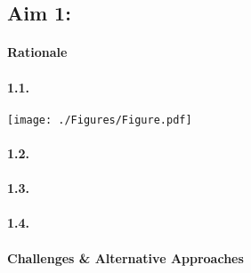 \newcommand{\FigInc}{%
\begin{wrapfigure}{R}{3.05in}
  \begin{mdframed}
  \texttt{[image: ./Figures/Figure.pdf]}
  \caption{An example figure with caption to explain.}
  \label{incFigure}
  \end{mdframed}
\end{wrapfigure}}

\subsection{Aim 1: \SpecificAimOne}

\paragraph{Rationale}

\lipsum[1-1]

\paragraph{1.1. \SpecificAimOneA}
\lipsum[2-2]


\begin{Figure}
	\centering
	\texttt{[image: ./Figures/Figure.pdf]}
\end{Figure}


\paragraph{1.2. \SpecificAimOneB}

\lipsum[3-3]

\paragraph{1.3. \SpecificAimOneC}

\lipsum[4-4]

\paragraph{1.4. \SpecificAimOneD}

\lipsum[5-5]

\paragraph{Challenges \& Alternative Approaches}

\lipsum[6-6]

